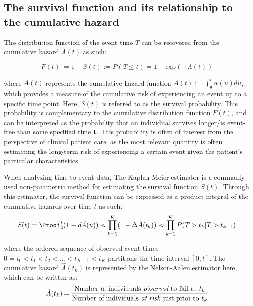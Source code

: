 \subsection{The survival function and its relationship to the cumulative hazard}

The distribution function of the event time $T$ can be recovered from the cumulative hazard $A(t)$ as such: 

\begin{equation}
F(t) := 1 - S(t) := P(T \leq t) = 1 - \textrm{exp}(-A(t))
\end{equation}

where $A(t)$ represents the cumulative hazard function $A(t) := \int_{0}^{t} \alpha(u) du$, which provides a measure of the cumulative risk of experiencing an event up to a specific time point. Here, $S(t)$ is referred to as the survival probability. This probability is complementary to the cumulative distribution function $F(t)$, and can be interpreted as the probability that an individual survives longer/is event-free than some specified time \textbf{t}. This probability is often of interest from the perspective of clinical patient care, as the most relevant quantity is often estimating the long-term risk of experiencing a certain event given the patient’s particular characteristics.
\smallskip \par

When analyzing time-to-event data, The Kaplan-Meier estimator is a commonly used non-parametric method for estimating the survival function $S(t)$.
Through this estimator, the survival function can be expressed as a product integral of the cumulative hazards over time $t$ as such: 
\begin{equation}
S(t) = \Prodi_{0}^{t} (1- d\hat{A}(u)) \approx \prod_{k = 1}^{K} (1- \Delta \hat{A}(t_k)) \approx \prod_{k = 1}^{K} P(T > t_k | T > t_{k-1})
\end{equation}

where the ordered sequence of observed event times $0 = t_0 < t_1 < t_2 <...< t_{K-1} <t_K$ partitions the time interval $[0,t]$. The cumulative hazard $\hat{A}(t_k)$ is represented by the Nelson-Aalen estimator here, which can be written as:
\begin{equation}
\hat{A}(t_k) = \frac{\text{Number of individuals \textit{observed} to fail at $t_k$}}{\text{Number of individuals \textit{at risk} just prior to $t_k$}}
\end{equation}


